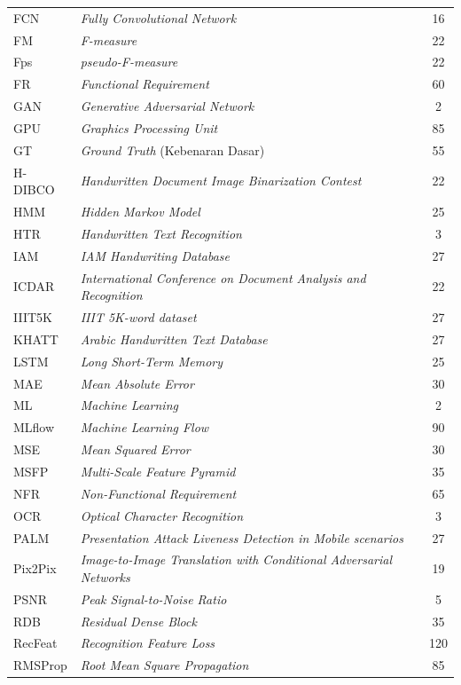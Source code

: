 \begin{longtable}{@{} l >{\raggedright\arraybackslash}p{7.5cm} c @{}}
FCN & \textit{Fully Convolutional Network} & 16 \\
FM & \textit{F-measure} & 22 \\
Fps & \textit{pseudo-F-measure} & 22 \\
FR & \textit{Functional Requirement} & 60 \\
GAN & \textit{Generative Adversarial Network} & 2 \\
GPU & \textit{Graphics Processing Unit} & 85 \\
GT & \textit{Ground Truth} (Kebenaran Dasar) & 55 \\
H-DIBCO & \textit{Handwritten Document Image Binarization Contest} & 22 \\
HMM & \textit{Hidden Markov Model} & 25 \\
HTR & \textit{Handwritten Text Recognition} & 3 \\
IAM & \textit{IAM Handwriting Database} & 27 \\
ICDAR & \textit{International Conference on Document Analysis and Recognition} & 22 \\
IIIT5K & \textit{IIIT 5K-word dataset} & 27 \\
KHATT & \textit{Arabic Handwritten Text Database} & 27 \\
LSTM & \textit{Long Short-Term Memory} & 25 \\
MAE & \textit{Mean Absolute Error} & 30 \\
ML & \textit{Machine Learning}  & 2 \\
MLflow & \textit{Machine Learning Flow} & 90 \\
MSE & \textit{Mean Squared Error}  & 30 \\
MSFP & \textit{Multi-Scale Feature Pyramid} & 35 \\
NFR & \textit{Non-Functional Requirement}  & 65 \\
OCR & \textit{Optical Character Recognition} & 3 \\
PALM & \textit{Presentation Attack Liveness Detection in Mobile scenarios} & 27 \\
Pix2Pix & \textit{Image-to-Image Translation with Conditional Adversarial Networks} & 19 \\
PSNR & \textit{Peak Signal-to-Noise Ratio} & 5 \\
RDB & \textit{Residual Dense Block} & 35 \\
RecFeat & \textit{Recognition Feature Loss} & 120 \\
RMSProp & \textit{Root Mean Square Propagation} & 85 \\

\end{longtable}
